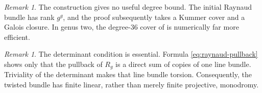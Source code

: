 \documentclass[10pt,a4paper,reqno]{amsart}
\theoremstyle{remark}
\newtheorem{remark}[theorem]{Remark}
\begin{document}
\begin{remark}
The construction gives no useful degree bound.  The initial Raynaud bundle
has rank $g^g$, and the proof subsequently takes a Kummer cover and a Galois
closure.  In genus two, the degree-$36$ cover of \cite{LandesmanLitt} is
numerically far more efficient.
\end{remark}

\begin{remark}
The determinant condition is essential.  Formula
\eqref{eq:raynaud-pullback} shows only that the pullback of $R_g$ is a direct
sum of copies of one line bundle.  Triviality of the determinant makes that
line bundle torsion.  Consequently, the twisted bundle has finite linear,
rather than merely finite projective, monodromy.
\end{remark}



\end{document}
